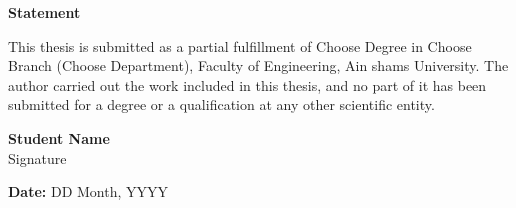 \cleardoublepage
\setlength{\thesignaturewidth}{2cm}
\newpage
\thispagestyle{empty}
\begin{center}\huge\textbf{Statement}\end{center}
\Large
\vfill
This thesis is submitted as a partial fulfillment of Choose Degree in Choose Branch (Choose Department), Faculty of Engineering, Ain shams University.
The author carried out the work included in this thesis, and no part of it has been submitted for a degree or a qualification at any other scientific entity. 







\vfill
\begin{flushright}
\large
\textbf{Student Name} \\

\small
Signature \\
\dotfill \hspace{0.1\thesignaturewidth}

\textbf{Date:} DD Month, YYYY \\
\end{flushright}
\vfill

\normalsize
